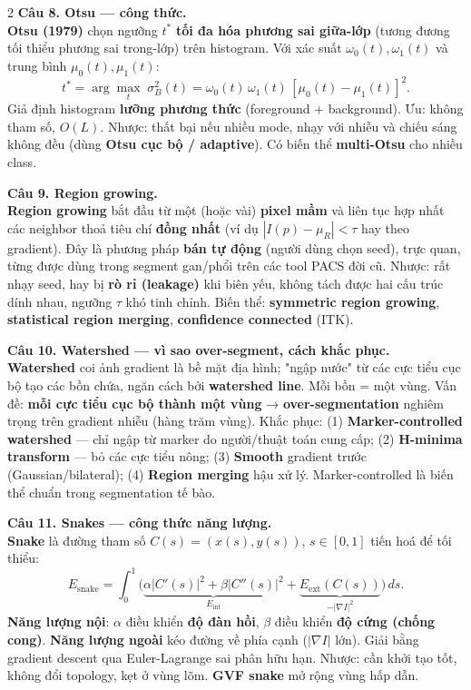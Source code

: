 \begin{paracol}{2}
\textbf{Câu 8. Otsu — công thức.}\\
\textbf{Otsu (1979)} chọn ngưỡng $t^*$ \textbf{tối đa hóa phương sai giữa-lớp} (tương đương tối thiểu phương sai trong-lớp) trên histogram. Với xác suất $\omega_0(t),\omega_1(t)$ và trung bình $\mu_0(t),\mu_1(t)$:
\[t^*=\arg\max_t \;\sigma_B^2(t)=\omega_0(t)\,\omega_1(t)\,[\mu_0(t)-\mu_1(t)]^2.\]
Giả định histogram \textbf{lưỡng phương thức} (foreground + background). Ưu: không tham số, $O(L)$. Nhược: thất bại nếu nhiều mode, nhạy với nhiễu và chiếu sáng không đều (dùng \textbf{Otsu cục bộ / adaptive}). Có biến thể \textbf{multi-Otsu} cho nhiều class.

\textbf{Câu 9. Region growing.}\\
\textbf{Region growing} bắt đầu từ một (hoặc vài) \textbf{pixel mầm} và liên tục hợp nhất các neighbor thoả tiêu chí \textbf{đồng nhất} (ví dụ $|I(p)-\mu_R|<\tau$ hay theo gradient). Đây là phương pháp \textbf{bán tự động} (người dùng chọn seed), trực quan, từng được dùng trong segment gan/phổi trên các tool PACS đời cũ. Nhược: rất nhạy seed, hay bị \textbf{rò rỉ (leakage)} khi biên yếu, không tách được hai cấu trúc dính nhau, ngưỡng $\tau$ khó tinh chỉnh. Biến thể: \textbf{symmetric region growing}, \textbf{statistical region merging}, \textbf{confidence connected} (ITK).

\textbf{Câu 10. Watershed — vì sao over-segment, cách khắc phục.}\\
\textbf{Watershed} coi ảnh gradient là bề mặt địa hình; "ngập nước" từ các cực tiểu cục bộ tạo các bồn chứa, ngăn cách bởi \textbf{watershed line}. Mỗi bồn = một vùng. Vấn đề: \textbf{mỗi cực tiểu cục bộ thành một vùng} → \textbf{over-segmentation} nghiêm trọng trên gradient nhiễu (hàng trăm vùng). Khắc phục: (1) \textbf{Marker-controlled watershed} — chỉ ngập từ marker do người/thuật toán cung cấp; (2) \textbf{H-minima transform} — bỏ các cực tiểu nông; (3) \textbf{Smooth} gradient trước (Gaussian/bilateral); (4) \textbf{Region merging} hậu xử lý. Marker-controlled là biến thể chuẩn trong segmentation tế bào.

\textbf{Câu 11. Snakes — công thức năng lượng.}\\
\textbf{Snake} là đường tham số $C(s)=(x(s),y(s)),\,s\in[0,1]$ tiến hoá để tối thiểu:
\[E_{\text{snake}}=\int_0^1\!\!\big(\underbrace{\alpha|C'(s)|^2+\beta|C''(s)|^2}_{E_{\text{int}}}+\underbrace{E_{\text{ext}}(C(s))}_{-|\nabla I|^2}\big)\,ds.\]
\textbf{Năng lượng nội}: $\alpha$ điều khiển \textbf{độ đàn hồi}, $\beta$ điều khiển \textbf{độ cứng (chống cong)}. \textbf{Năng lượng ngoài} kéo đường về phía cạnh ($|\nabla I|$ lớn). Giải bằng gradient descent qua Euler-Lagrange sai phân hữu hạn. Nhược: cần khởi tạo tốt, không đổi topology, kẹt ở vùng lõm. \textbf{GVF snake} mở rộng vùng hấp dẫn.


\end{paracol}
